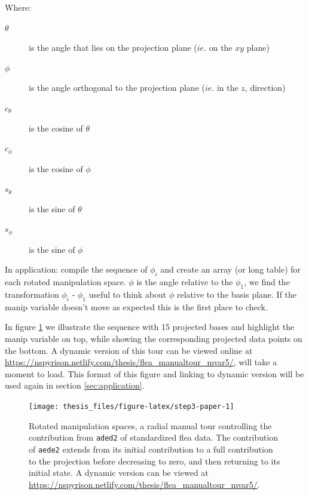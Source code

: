 \documentclass{monashthesis}
\begin{document}
Where:

\begin{description}
  \item[$\theta$] is the angle that lies on the projection plane ($ie.$ on the $xy$ plane)
  \item[$\phi$] is the angle orthogonal to the projection plane ($ie.$ in the $z$,  direction)
  \item[$c_\theta$] is the cosine of $\theta$
  \item[$c_\phi$]   is the cosine of $\phi$
  \item[$s_\theta$] is the sine of   $\theta$
  \item[$s_\phi$]   is the sine of   $\phi$
\end{description}

In application: compile the sequence of \(\phi_i\) and create an array
(or long table) for each rotated manipulation space. \(\phi\) is the
angle relative to the \(\phi_1\), we find the transformation \(\phi_i\)
- \(\phi_1\) useful to think about \(\phi\) relative to the basis plane.
If the manip variable doesn't move as expected this is the first place
to check.

\begin{Shaded}
\begin{Highlighting}[]
 
\StringTok{ }\OperatorTok{+}\StringTok{ }
\StringTok{ }\NormalTok{(manip_space, theta, phi)[, }\OperatorTok{:}\NormalTok{]}
\NormalTok{\}}
\end{Highlighting}
\end{Shaded}

In figure \ref{fig:step3-paper} we illustrate the sequence with 15
projected bases and highlight the manip variable on top, while showing
the corresponding projected data points on the bottom. A dynamic version
of this tour can be viewed online at
\url{https://nspyrison.netlify.com/thesis/flea_manualtour_mvar5/}, will
take a moment to load. This format of this figure and linking to dynamic
version will be used again in section \ref{sec:application}.









\begin{figure}

{\centering \texttt{[image: thesis\_files/figure-latex/step3-paper-1]} 

}

\caption{Rotated manipulation spaces, a radial manual tour
controlling the contribution from \texttt{aded2} of standardized flea
data. The contribution of \texttt{aede2} extends from its initial
contribution to a full contribution to the projection before decreasing
to zero, and then returning to its initial state. A dynamic version can
be viewed at
\url{https://nspyrison.netlify.com/thesis/flea_manualtour_mvar5/}.}\label{fig:step3-paper}
\end{figure}
\end{document}
